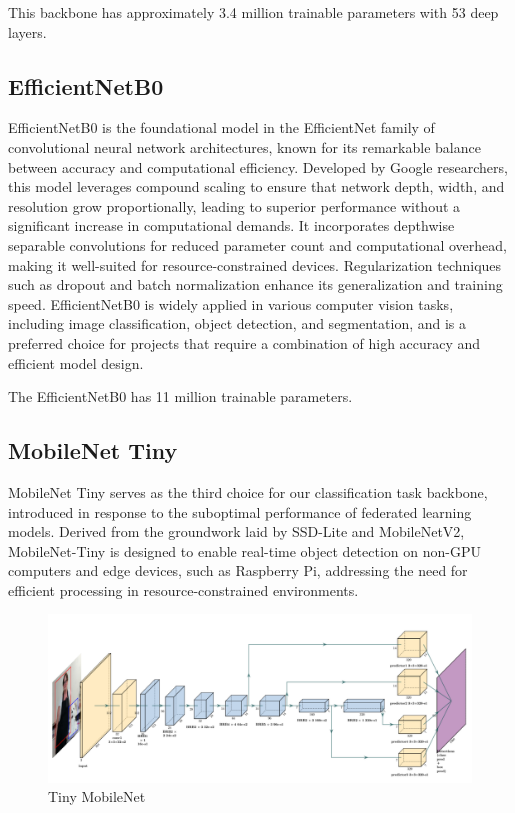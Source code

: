 \documentclass[runningheads,a4paper,11pt]{report}
\begin{document}
This backbone has approximately 3.4 million trainable parameters with 53 deep layers.
\subsection{EfficientNetB0}

EfficientNetB0 is the foundational model in the EfficientNet family of convolutional neural network architectures, known for its remarkable balance between accuracy and computational efficiency. Developed by Google researchers, this model leverages compound scaling to ensure that network depth, width, and resolution grow proportionally, leading to superior performance without a significant increase in computational demands. It incorporates depthwise separable convolutions for reduced parameter count and computational overhead, making it well-suited for resource-constrained devices. Regularization techniques such as dropout and batch normalization enhance its generalization and training speed. EfficientNetB0 is widely applied in various computer vision tasks, including image classification, object detection, and segmentation, and is a preferred choice for projects that require a combination of high accuracy and efficient model design.

The EfficientNetB0 has 11 million trainable parameters.

\subsection{MobileNet Tiny}

MobileNet Tiny serves as the third choice for our classification task backbone, introduced in response to the suboptimal performance of federated learning models. Derived from the groundwork laid by SSD-Lite and MobileNetV2, MobileNet-Tiny is designed to enable real-time object detection on non-GPU computers and edge devices, such as Raspberry Pi, addressing the need for efficient processing in resource-constrained environments.

\begin{figure}[h]
    \centering
    \includegraphics[scale=0.5]{images/tiny.png} 
    \caption{Tiny MobileNet}
\end{figure}
\end{document}
